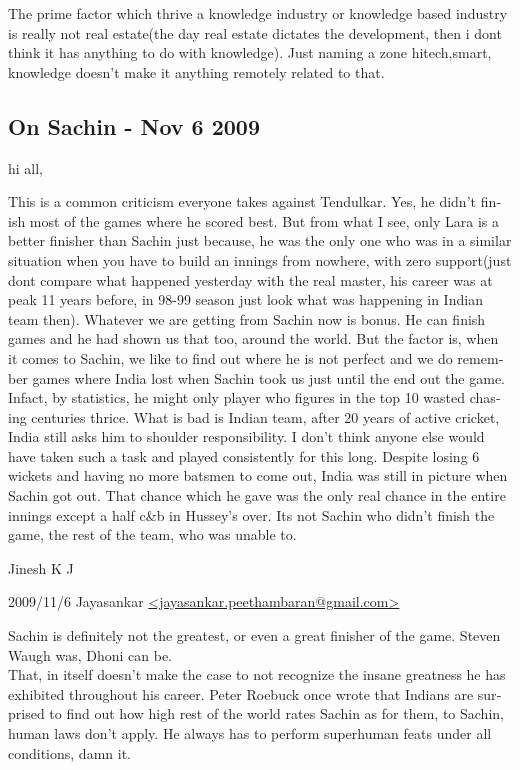 \begin{english}
The prime factor which thrive a knowledge industry or knowledge based industry is really not real estate(the day real estate dictates the development, then i dont think it has anything to do with knowledge). Just naming a zone hitech,smart, knowledge doesn't make it anything remotely related to that.


\subsection*{On Sachin - Nov 6 2009}

hi all,

This is a common criticism everyone takes against Tendulkar. Yes, he didn't finish most of the games where he scored best. But from what I see, only Lara is a better finisher than Sachin just because, he was the only one who was in a similar situation when you have to build an innings from nowhere, with zero support(just dont compare what happened yesterday with the real master, his career was at peak 11 years before, in 98-99 season just look what was happening in Indian team then). Whatever we are getting from Sachin now is bonus. He can finish games and he had shown us that too, around the world. But the factor is, when it comes to Sachin, we like to find out where he is not perfect and we do remember games where India lost when Sachin took us just until the end out the game. Infact, by statistics, he might only player who figures in the top 10 wasted chasing centuries thrice. What is bad is Indian team, after 20 years of active cricket, India still asks him to shoulder responsibility. I don't think anyone else would have taken such a task and played consistently for  this long. Despite losing 6 wickets and having no more batsmen to come out, India was still in picture when Sachin got out. That chance which he gave was the only real chance in the entire innings except a half c\&b in Hussey's over. Its not Sachin who didn't finish the game, the rest of the team, who was unable to.

Jinesh K J

2009/11/6 Jayasankar \url{<jayasankar.peethambaran@gmail.com>}

    Sachin is definitely not the greatest, or even a great finisher of the game. Steven Waugh was, Dhoni can be.\\

    That, in itself doesn't make the case to not recognize the insane greatness he has exhibited throughout his career. Peter Roebuck once wrote that Indians are surprised to find out how high rest of the world rates Sachin as for them, to Sachin, human laws don't apply. He always has to perform superhuman feats under all conditions, damn it.




\end{english}
